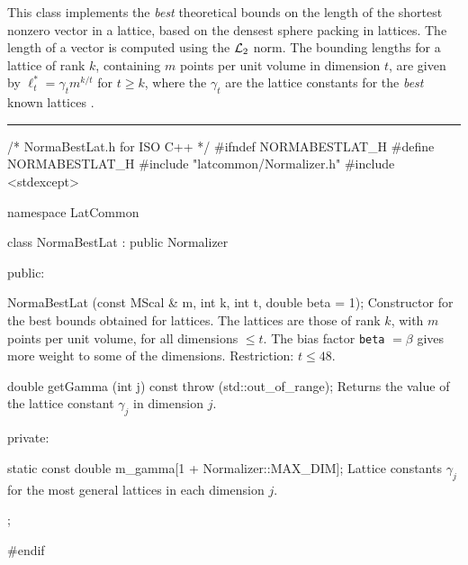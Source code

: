 % 
% 
% 
% 


 This class implements the {\em best} theoretical bounds on the length of the
 shortest nonzero vector in a lattice, based on the densest sphere packing in 
 lattices.  The length of a vector is computed using the
 ${\cal L}_2$ norm. The bounding lengths for a lattice of rank $k$, 
  containing $m$ points per unit volume in dimension $t$, are given by
 $\ell_t^* = \gamma_t m^{k/t}$ for $t \ge k$, where the $\gamma_t$ are
 the lattice constants for the {\em best} known lattices \cite{mCON99a}.

\bigskip\hrule
\code \hide
/* NormaBestLat.h for ISO C++ */
#ifndef NORMABESTLAT_H
#define NORMABESTLAT_H
\endhide 
#include "latcommon/Normalizer.h"
#include <stdexcept>


namespace LatCommon {

class NormaBestLat : public Normalizer {
public:

   NormaBestLat (const MScal & m, int k, int t, double beta = 1);
\endcode
 \tabb Constructor for the best bounds obtained for lattices. The 
   lattices are those of rank $k$,
   with $m$ points per unit volume, for all dimensions  $\le t$.
   The bias factor \texttt{beta} $= \beta$ gives more weight to some of the
   dimensions. %
  Restriction: $t \le 48$.
  \endtabb
\code

   double getGamma (int j) const throw (std::out_of_range);
\endcode
 \tabb 
   Returns the value of the lattice constant $\gamma_j$ in dimension  $j$.
 \endtabb
\ifdetailed
\code


private:

   static const double m_gamma[1 + Normalizer::MAX_DIM];
\endcode
 \tabb 
  Lattice constants $\gamma_j$ for the most general lattices in each
  dimension $j$.
  \endtabb
\fi
\code

};

}

\hide
#endif
\endhide
\endcode
